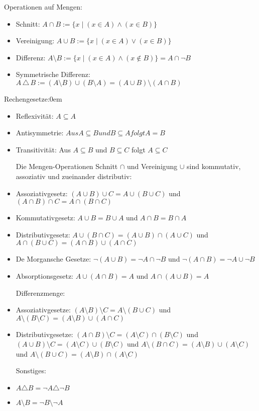 \documentclass[11pt]{article}
\begin{document}
Operationen auf Mengen:
\begin{itemize}\itemsep0em\small
\item Schnitt: $A \cap B := \{ x \mid \left( x \in A \right) \land \left( x \in B \right) \}$
\item Vereinigung: $A \cup B := \{ x \mid \left( x \in {A} \right) \lor \left( x \in B \right) \}$
\item Differenz: $A \setminus B := \{ x \mid \left( x\in A \right) \land \left( x\not \in B \right) \} = A \cap \neg B$
\item Symmetrische Differenz: $A \, \triangle \, B := \left( A \setminus B \right) \cup \left( B \setminus A \right) = ( A \cup B) \setminus (A \cap B) $
\end{itemize}  \normalsize
Rechengesetze:\itemsep0em\small
\begin{itemize}
\item Reflexivit{\"a}t: $A\subseteq A$
\item Antisymmetrie: $Aus A\subseteq B und B\subseteq A folgt A = B$
\item Transitivit{\"a}t: Aus $A\subseteq B$ und $B\subseteq C$ folgt $A\subseteq C$

Die Mengen-Operationen Schnitt $\cap$ und Vereinigung $\cup$ sind kommutativ, assoziativ und zueinander distributiv:
\item Assoziativgesetz: $\left( A \cup B \right) \cup C = A \cup \left( B \cup C \right)$ und $\left( A \cap B \right) \cap C = A \cap \left( B \cap C \right)$
\item Kommutativgesetz: $A \cup B = B \cup A$ und $A \cap B = B \cap A$
\item Distributivgesetz: $A \cup \left( B \cap C \right) = \left( A \cup B \right) \cap \left( A \cup C \right)$ und $A \cap \left( B \cup C \right) = \left( A \cap B \right) \cup \left( A \cap C \right)$
\item De Morgansche Gesetze: $\neg \left( A \cup B \right) = \neg A \cap \neg B$ und $\neg \left( A \cap B \right) = \neg A \cup \neg B$
\item Absorptionsgesetz: $A \cup \left( A \cap B \right) =A$ und $A \cap \left( A \cup B \right) = A$

Differenzmenge:
\item Assoziativgesetze: $(A \setminus B) \setminus C = A \setminus (B \cup C)$ und $A \setminus (B \setminus C) = (A \setminus B) \cup (A \cap C)$
\item Distributivgesetze: $(A \cap B) \setminus C = (A \setminus C) \cap (B \setminus C)$ und $(A \cup B) \setminus C = (A \setminus C) \cup (B \setminus C)$ und $A \setminus (B \cap C) = (A \setminus B) \cup (A \setminus C)$ und $A \setminus (B \cup C) = (A \setminus B) \cap (A \setminus C)$ 

Sonstiges:
\item $A \triangle B = \neg A \triangle \neg B$
\item $A \setminus B = \neg B \setminus \neg A$
\end{itemize}  \normalsize
\end{document}
